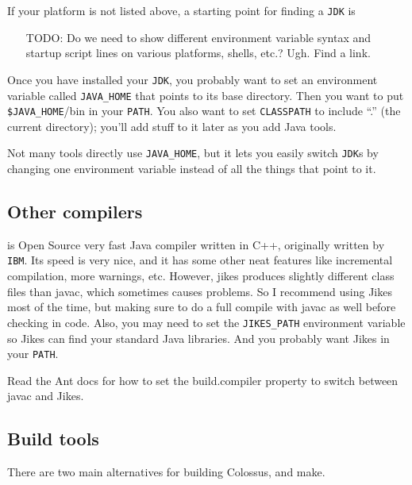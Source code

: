 \documentclass{article}
\begin{document}
If your platform is not listed above, a starting point for finding
a \texttt{JDK} is 

\begin{itemize}
\item[TODO:]  Do we need to show different environment variable syntax and
startup script lines on various platforms, shells, etc.?  Ugh.  Find
a link.
\end{itemize}

Once you have installed your \texttt{JDK}, you probably want to set an environment 
variable called \texttt{JAVA\_HOME} that points to its base directory.  Then you want 
to put \texttt{\$JAVA\_HOME}/bin in your \texttt{PATH}.  You also want to set \texttt{CLASSPATH} to 
include ``.'' (the current directory); you'll add stuff to it later as you 
add Java tools.

Not many tools directly use \texttt{JAVA\_HOME}, but it lets you easily switch \texttt{JDK}s 
by changing one environment variable instead of all the things that point 
to it.

\subsection{Other compilers}

 is Open Source very fast Java compiler written
in C++, originally
written by \texttt{IBM}.  Its speed is very nice, and it has some other neat 
features like incremental compilation, more warnings, etc.  However, 
jikes produces slightly different class files than javac, which 
sometimes causes problems.  So I recommend using Jikes most of the time,
but making sure to do a full compile with javac as well before checking
in code.
Also, you may need to set the \texttt{JIKES\_PATH} environment variable so Jikes 
can find your standard Java libraries.  And you probably want Jikes in
your \texttt{PATH}.

Read the Ant docs for how to set the build.compiler property to 
switch between javac and Jikes.

\subsection{Build tools}

There are two main alternatives for building Colossus,  and make.
\end{document}
